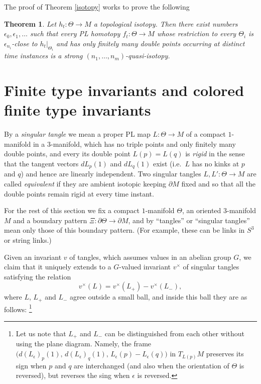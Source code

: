\documentclass[a4paper,12pt,reqno,oneside]{amsart} %
\theoremstyle{plain}
\newtheorem{theorem}{Theorem}[section]
\theoremstyle{definition}
\theoremstyle{named}
\def\x{\times}
\renewcommand{\:}{\colon}
\begin{document}
The proof of Theorem \ref{isotopy} works to prove the following

\begin{theorem} \label{isotopy'}
Let $h_t\:\Theta\to M$ a topological isotopy.
Then there exist numbers $\epsilon_0,\epsilon_1,\dots$ such that every PL homotopy $f_t\:\Theta\to M$
whose restriction to every $\Theta_i$ is $\epsilon_{n_i}$-close to $h_t|_{\Theta_i}$ and has only finitely 
many double points occurring at distinct time instances is a strong $(n_1,\dots,n_m)$-quasi-isotopy.
\end{theorem}


\section{Finite type invariants and colored finite type invariants}\label{fti}

By a {\it singular tangle} we mean a proper PL map $L\:\Theta\to M$ of a compact $1$-manifold in a $3$-manifold, 
which has no triple points and only finitely many double points, and every its double point $L(p)=L(q)$ is 
{\it rigid} in the sense that the tangent vectors $dL_p(1)$ and $dL_q(1)$ exist (i.e.\ $L$ has no kinks at $p$ 
and $q$) and hence are linearly independent.
Two singular tangles $L,L'\:\Theta\to M$ are called {\it equivalent} if they are ambient isotopic keeping $\partial M$ 
fixed and so that all the double points remain rigid at every time instant.

For the rest of this section we fix a compact $1$-manifold $\Theta$, an oriented $3$-manifold $M$ and 
a boundary pattern $\Xi\:\partial\Theta\to\partial M$, and by ``tangles'' or ``singular tangles'' mean only 
those of this boundary pattern.
(For example, these can be links in $S^3$ or string links.)

Given an invariant $v$ of tangles, which assumes values in an abelian group $G$, we claim that it uniquely extends 
to a $G$-valued invariant $v^\x$ of singular tangles satisfying the relation
\[v^\x(L)=v^\x(L_+)-v^\x(L_-), \tag{V}\label{vassiliev-extension}\]
where $L$, $L_+$ and $L_-$ agree outside a small ball, and inside this ball they are as follows:%
\footnote{Let us note that $L_+$ and $L_-$ can be distinguished from each other without using the plane diagram.
Namely, the frame $\big(d(L_\epsilon)_p(1),\,d(L_\epsilon)_q(1),\,L_\epsilon(p)-L_\epsilon(q)\big)$ in $T_{L(p)}M$ 
preserves its sign when $p$ and $q$ are interchanged (and also when the orientation of $\Theta$ is reversed), but reverses the sing
when $\epsilon$ is reversed.}
\smallskip
\end{document}
